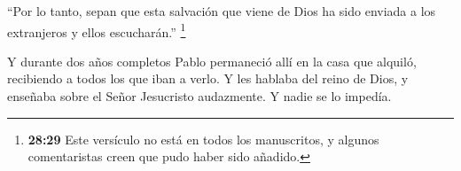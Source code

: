  ``Por lo tanto, sepan que esta salvación que viene de Dios
ha sido enviada a los extranjeros y ellos escucharán.'' 
\footnote{\textbf{28:29} Este versículo no está en todos los
  manuscritos, y algunos comentaristas creen que pudo haber sido
  añadido.}

 Y durante dos años completos Pablo permaneció allí en la
casa que alquiló, recibiendo a todos los que iban a verlo. 
Y les hablaba del reino de Dios, y enseñaba sobre el Señor Jesucristo
audazmente. Y nadie se lo impedía.
